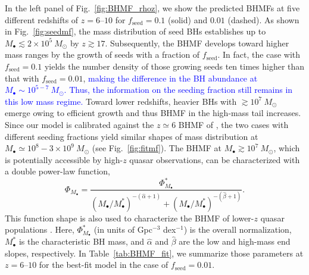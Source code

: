 \documentclass[twocolumn, twocolappendix]{aastex63}
\newcommand{\Msun}{M_\odot}
\newcommand{\fseed}{f_\mathrm{seed}}
\newcommand{\red}[1]{\textcolor{red}{ #1}}
\newcommand{\blue}[1]{\textcolor{blue}{ #1}}
\begin{document}
\begin{CJK*}{UTF8}{gbsn}
In the left panel of Fig.~\ref{fig:BHMF_rhoz}, we show the predicted BHMFs at five different redshifts of $z=6$--$10$
for $\fseed=0.1$ (solid) and $0.01$ (dashed).
As shown in Fig.~\ref{fig:seedmf}, the mass distribution of seed BHs establishes up to $M_\bullet \lesssim 2\times10^5~\Msun$ by $z\gtrsim 17$.
Subsequently, the BHMF develops toward higher mass ranges by the growth of seeds with a fraction of $\fseed$.
In fact, the case with $\fseed=0.1$ yields the number density of those growing seeds ten times higher than that with $\fseed =0.01$,
\blue{making the difference in the BH abundance at $M_\bullet \sim 10^{5-7}~\Msun$.
Thus, the information on the seeding fraction still remains in this low mass regime.}
Toward lower redshifts, heavier BHs with $\gtrsim 10^7~\Msun$ emerge owing to efficient growth
and thus BHMF in the high-mass tail increases.
Since our model is calibrated against the $z\simeq 6$ BHMF of ,
the two cases with different seeding fractions yield similar shapes of mass distribution at $M_\bullet \simeq 10^8-3\times 10^9~\Msun$ (see Fig.~\ref{fig:fitmf}).
The BHMF at $M_\bullet \gtrsim 10^7~\Msun$, which is potentially accessible by high-$z$ quasar observations,
can be characterized with a double power-law function, 
%
\begin{equation}
\Phi_{M_\bullet}=\frac{\Phi_{M_\bullet}^\ast}{(M_\bullet/M_{\bullet}^\ast)^{-(\hat \alpha+1)} + (M_\bullet/M_{\bullet}^\ast)^{-(\hat \beta+1)}}.
\end{equation}
%
This function shape is also used to characterize the BHMF of lower-$z$ quasar populations
\citep[e.g.,][]{2013ApJ...764...45K,2015MNRAS.447.2085S}.
Here, $\Phi_{M_\bullet}^\ast$ (in units of Gpc$^{-3}$ dex$^{-1}$) is the overall normalization, $M_\bullet^\ast$ is the characteristic BH mass,
and $\hat \alpha$ and $\hat \beta$ are the low and high-mass end slopes, respectively.
In Table~\ref{tab:BHMF_fit}, we summarize those parameters at $z=6$--$10$ for the best-fit model in the case of $\fseed=0.01$.
%





\end{CJK*}
\end{document}
